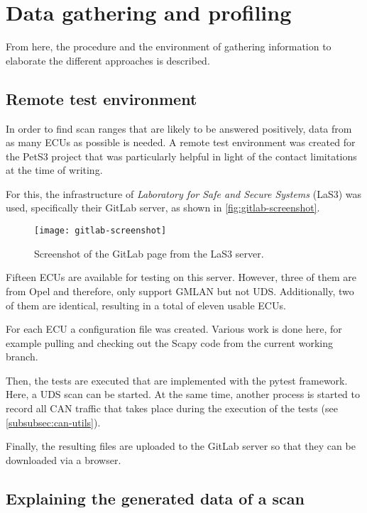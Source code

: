 \chapter{Data gathering and profiling}
\label{sec:data-gathering}

From here, the procedure and the environment of gathering information to elaborate the different approaches is described.

\section{Remote test environment}

In order to find scan ranges that are likely to be answered positively, data from as many ECUs as possible is needed. A remote test environment was created for the PetS3 project that was particularly helpful in light of the contact limitations at the time of writing.

For this, the infrastructure of \emph{Laboratory for Safe and Secure Systems} (LaS3) was used, specifically their GitLab server, as shown in \autoref{fig:gitlab-screenshot}.

\begin{figure}[htb]
    \centering
    \texttt{[image: gitlab-screenshot]}
    \caption{Screenshot of the GitLab page from the LaS3 server.}
    \label{fig:gitlab-screenshot}
\end{figure}

Fifteen ECUs are available for testing on this server. However, three of them are from Opel and therefore, only support GMLAN but not UDS. Additionally, two of them are identical, resulting in a total of eleven usable ECUs.

For each ECU a configuration file was created. Various work is done here, for example pulling and checking out the Scapy code from the current working branch.

Then, the tests are executed that are implemented with the pytest framework. Here, a UDS scan can be started. At the same time, another process is started to record all CAN traffic that takes place during the execution of the tests (see \autoref{subsubsec:can-utils}).

Finally, the resulting files are uploaded to the GitLab server so that they can be downloaded via a browser.

\section{Explaining the generated data of a scan}

